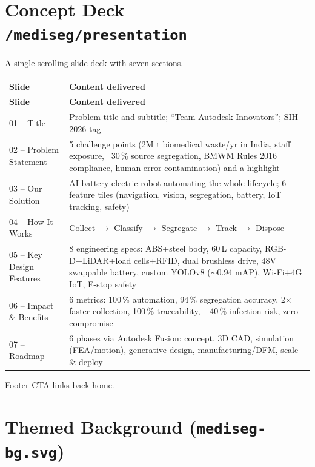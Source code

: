 \documentclass[11pt, a4paper]{article}
\begin{document}
\section{Concept Deck \texttt{/mediseg/presentation}}

A single scrolling slide deck with seven sections.

\begin{longtable}{lX}
  \toprule
  \textbf{Slide} & \textbf{Content delivered}\\
  \midrule
  \endfirsthead
  \toprule
  \textbf{Slide} & \textbf{Content delivered}\\
  \midrule
  \endhead
  01 -- Title & Problem title and subtitle; ``Team Autodesk Innovators''; SIH 2026 tag\\
  02 -- Problem Statement & 5 challenge points (2M t biomedical waste/yr in India, staff exposure,
    ~30\,\% source segregation, BMWM Rules 2016 compliance, human-error contamination) and a highlight\\
  03 -- Our Solution & AI battery-electric robot automating the whole lifecycle; 6 feature tiles
    (navigation, vision, segregation, battery, IoT tracking, safety)\\
  04 -- How It Works & Collect $\rightarrow$ Classify $\rightarrow$ Segregate $\rightarrow$ Track $\rightarrow$ Dispose\\
  05 -- Key Design Features & 8 engineering specs: ABS+steel body, 60\,L capacity, RGB-D+LiDAR+load
    cells+RFID, dual brushless drive, 48V swappable battery, custom YOLOv8 ($\sim$0.94 mAP),
    Wi-Fi+4G IoT, E-stop safety\\
  06 -- Impact \& Benefits & 6 metrics: 100\,\% automation, 94\,\% segregation accuracy, 2$\times$
    faster collection, 100\,\% traceability, $-$40\,\% infection risk, zero compromise\\
  07 -- Roadmap & 6 phases via Autodesk Fusion: concept, 3D CAD, simulation (FEA/motion),
    generative design, manufacturing/DFM, scale \& deploy\\
  \bottomrule
\end{longtable}

Footer CTA links back home.

\section{Themed Background (\texttt{mediseg-bg.svg})}
\end{document}
